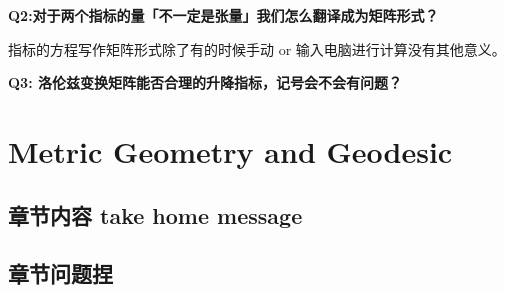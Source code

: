 \bigskip
\textbf{Q2:对于两个指标的量「不一定是张量」我们怎么翻译成为矩阵形式？}

指标的方程写作矩阵形式除了有的时候手动 or 输入电脑进行计算没有其他意义。


\textbf{Q3: 洛伦兹变换矩阵能否合理的升降指标，记号会不会有问题？}


\section{Metric Geometry and Geodesic}

\subsection{章节内容 take home message}



\subsection{章节问题捏}



